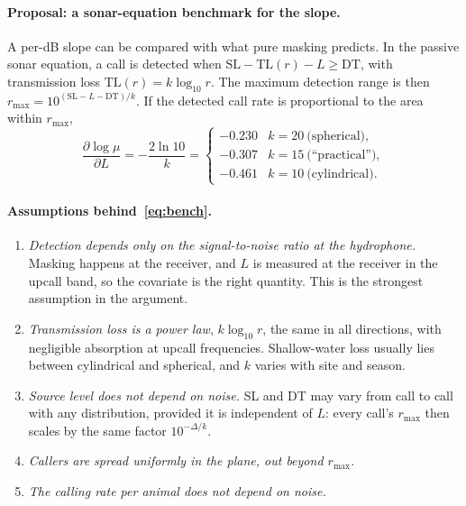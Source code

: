 \documentclass[11pt]{article}
\begin{document}
\paragraph{Proposal: a sonar-equation benchmark for the slope.}
A per-dB slope can be compared with what pure masking predicts. In the passive
sonar equation, a call is detected when $\mathrm{SL}-\mathrm{TL}(r)-L\ge
\mathrm{DT}$, with transmission loss $\mathrm{TL}(r)=k\log_{10}r$. The maximum
detection range is then $r_{\max}=10^{(\mathrm{SL}-L-\mathrm{DT})/k}$. If the
detected call rate is proportional to the area within $r_{\max}$,
\begin{equation}\label{eq:bench}
\frac{\partial\log\mu}{\partial L}=-\frac{2\ln 10}{k}
=\begin{cases}-0.230 & k=20\ \text{(spherical)},\\ -0.307 & k=15\ \text{(``practical'')},\\ -0.461 & k=10\ \text{(cylindrical)}.\end{cases}
\end{equation}

\paragraph{Assumptions behind~\eqref{eq:bench}.}
\begin{enumerate}[label=A\arabic*.,leftmargin=2.2em]
\item \emph{Detection depends only on the signal-to-noise ratio at the
  hydrophone.} Masking happens at the receiver, and $L$ is measured at the
  receiver in the upcall band, so the covariate is the right quantity. This
  is the strongest assumption in the argument.
\item \emph{Transmission loss is a power law}, $k\log_{10}r$, the same in all
  directions, with negligible absorption at upcall frequencies. Shallow-water
  loss usually lies between cylindrical and spherical, and $k$ varies with site
  and season.
\item \emph{Source level does not depend on noise.} SL and DT may vary from
  call to call with any distribution, provided it is independent of $L$:
  every call's $r_{\max}$ then scales by the same factor $10^{-\Delta/k}$.
\item \emph{Callers are spread uniformly in the plane, out beyond $r_{\max}$.}
\item \emph{The calling rate per animal does not depend on noise.}
\end{enumerate}
\end{document}
